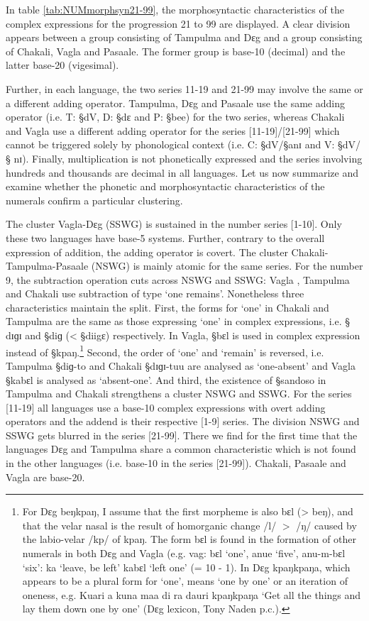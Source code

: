 In table \ref{tab:NUMmorphsyn21-99},  the morphosyntactic characteristics of the
 complex expressions for the progression  21 to 99 are displayed.   A clear
division appears between a group consisting of Tampulma and Dɛg  and a group
consisting of Chakali, Vagla and Pasaale. The former group is  base-10 (decimal)
and the latter base-20 (vigesimal).  

Further, in each language,  the two series 11-19 and
21-99 may involve the same or a different adding operator.   Tampulma, Dɛg
and Pasaale use the same adding operator (i.e. T: {\S dV}, D: {\S dɛ} and 
P: {\S bee}) for the two series, whereas Chakali and Vagla use a different
adding operator for the series [11-19]/[21-99] which cannot be triggered solely
by  phonological context (i.e. C: {\S d}V/{\S anɪ} and V: {\S d}V/{\S
nɪ}).  Finally, multiplication  is not phonetically expressed 
and the series involving hundreds and thousands are decimal in all languages. 
Let us now summarize and examine whether the phonetic and morphosyntactic 
characteristics of the numerals confirm a particular clustering.


The cluster Vagla-Dɛg (SSWG)  is sustained in the number series  [1-10]. Only
these two  languages have base-5 systems.  Further, contrary to the overall
expression of addition, the adding operator is covert.   The cluster
Chakali-Tampulma-Pasaale  (NSWG) is mainly atomic for the same series. For the
number 9, the subtraction operation cuts across  NSWG  and SSWG:  Vagla ,
Tampulma and Chakali  use subtraction of  type `one remains'.  Nonetheless three
characteristics maintain the split. First,  the forms for `one' in Chakali and
Tampulma are the same as those expressing `one' in complex expressions, i.e. {\S
dɪɡɪ} and  {\S diɡ} (< {\S diigɛ}) respectively. In Vagla, {\S bɛl} is used in
complex expression instead of {\S kpaŋ}.\footnote{For Dɛg  {\F beŋkpaŋ},  I
assume that the first morpheme is also {\F bɛl} (>  {\F beŋ}), and that the
velar nasal is the result of homorganic change {/l/}  $>$ {/ŋ/} caused by
the labio-velar {/kp/} of {\F kpaŋ}. The form {\F bɛl} is found in the
formation of other numerals in both  Dɛg and Vagla (e.g.  vag: {\F bɛl} `one',
{\F anue} `five', {\F anu-m-bɛl} `six': {\F ka} `leave, be left' {\F kabɛl}
`left one'  (=  10 - 1). In Dɛg {\F kpaŋkpaŋa}, which appears to be a plural
form for `one', means `one by one' or an iteration of oneness, e.g.  {\F Kuari a
kuna maa di ra dauri kpaŋkpaŋa} `Get all the things and lay them down one by
one' (Dɛg lexicon,  Tony Naden p.c.).} Second, the order of `one' and `remain'
is reversed, i.e.  Tampulma {\S diɡ-to} and Chakali  {\S dɪɡɪ-tuu} are analysed
as `one-absent' and Vagla {\S  kabɛl} is analysed as  `absent-one'. And third,
the existence of {\S sandoso} in Tampulma \citep{Ratt32b, Good54} and Chakali
strengthens a cluster NSWG  and SSWG. For the series [11-19] all languages use a
base-10 complex expressions with overt adding operators and the addend  is their
respective [1-9] series.   The division NSWG and SSWG gets blurred in the series
[21-99]. There we find for the first time that the languages Dɛg and Tampulma
share a common characteristic which is not found in the other languages (i.e.
base-10 in the series [21-99]).  Chakali, Pasaale and Vagla are base-20. 


